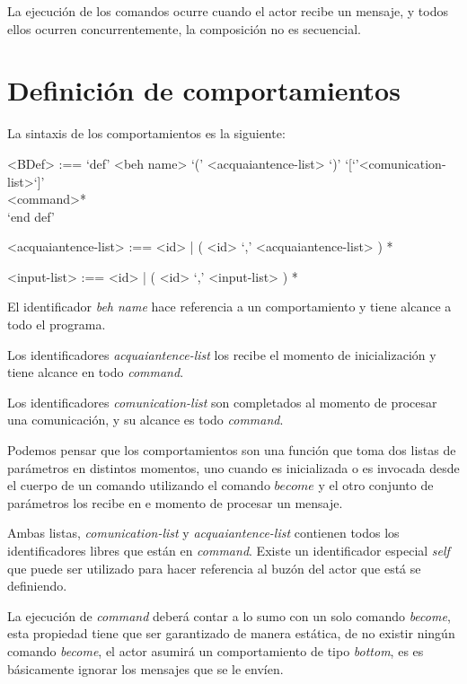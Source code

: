 La ejecución de los comandos ocurre cuando el actor recibe un mensaje, y todos
ellos ocurren concurrentemente, la composición no es secuencial.

\section{Definición de comportamientos}

La sintaxis de los comportamientos es la siguiente:

\begin{grammar}
<BDef> :== `def' <beh name> `(' <acquaiantence-list> `)' `[`'<comunication-list>`]' \\
\quad \quad <command>*  \\
\quad `end def'
  
<acquaiantence-list> :== <id> | ( <id> `,' <acquaiantence-list> ) *
  
<input-list> :== <id> | ( <id> `,' <input-list> ) *
\end{grammar}

El identificador \textit{beh name} hace referencia a un comportamiento y tiene alcance a todo el programa. 

Los identificadores \textit{acquaiantence-list} los recibe el momento de inicialización y tiene alcance en todo \textit{command}. 

Los identificadores \textit{comunication-list} son completados al momento de procesar una comunicación, y su alcance es todo \textit{command}. 

Podemos pensar que los comportamientos son una función que toma dos listas de parámetros en distintos momentos, uno cuando es inicializada o es invocada desde el cuerpo de un comando utilizando el comando $become$ y el otro conjunto de parámetros los recibe en e momento de procesar un mensaje.

Ambas listas, \textit{comunication-list} y \textit{acquaiantence-list} contienen todos los identificadores libres que están en \textit{command}. Existe un identificador especial \textit{self} que puede ser utilizado para hacer referencia al buzón del actor que está se definiendo. 

La ejecución de \textit{command} deberá contar a lo sumo con un solo comando \textit{become}, esta propiedad tiene que ser garantizado de manera estática, de no existir ningún comando \textit{become}, el actor asumirá un comportamiento de tipo \textit{bottom}, es es básicamente ignorar los mensajes que se le envíen.

